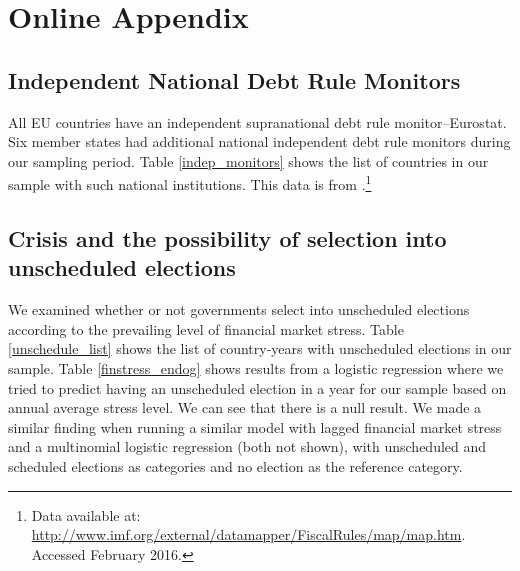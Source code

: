 \documentclass[]{article}
\begin{document}
\clearpage




\pagebreak
\renewcommand{\thepage}{A-\arabic{page}}\setcounter{page}{1}
\renewcommand{\thesection}{Appendix \arabic{section}}\setcounter{section}{0}
\renewcommand{\thetable}{A-\arabic{table}}\setcounter{table}{0}
\renewcommand{\thefigure}{A-\arabic{figure}}\setcounter{figure}{0}
\clearpage

\section*{Online Appendix}

\subsection*{Independent National Debt Rule Monitors}

All EU countries have an independent supranational debt rule monitor--Eurostat. Six member states had additional national independent debt rule monitors during our sampling period. Table \ref{indep_monitors} shows the list of countries in our sample with such national institutions. This data is from \cite{bova2015rules}.\footnote{Data available at: \url{http://www.imf.org/external/datamapper/FiscalRules/map/map.htm}. Accessed February 2016.}



\subsection*{Crisis and the possibility of selection into unscheduled elections}

We examined whether or not governments select into unscheduled elections according to the prevailing level of financial market stress. Table \ref{unschedule_list} shows the list of country-years with unscheduled elections in our sample. Table \ref{finstress_endog} shows results from a logistic regression where we tried to predict having an unscheduled election in a year for our sample based on annual average stress level. We can see that there is a null result. We made a similar finding when running a similar model with lagged financial market stress and a  multinomial logistic regression (both not shown), with unscheduled and scheduled elections as categories and no election as the reference category.


\end{document}
